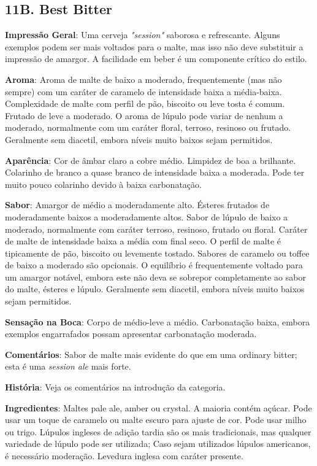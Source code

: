 \subsection*{11B. Best Bitter}
\textbf{Impressão Geral}: Uma cerveja \textit{"session"} saborosa e refrescante. Alguns exemplos podem ser mais voltados para o malte, mas isso não deve substituir a impressão de amargor. A facilidade em beber é um componente crítico do estilo.

\textbf{Aroma}: Aroma de malte de baixo a moderado, frequentemente (mas não sempre) com um caráter de caramelo de intensidade baixa a média-baixa. Complexidade de malte com perfil de pão, biscoito ou leve tosta é comum. Frutado de leve a moderado. O aroma de lúpulo pode variar de nenhum a moderado, normalmente com um caráter floral, terroso, resinoso ou frutado. Geralmente sem diacetil, embora níveis muito baixos sejam permitidos.

\textbf{Aparência}: Cor de âmbar claro a cobre médio. Limpidez de boa a brilhante. Colarinho de branco a quase branco de intensidade baixa a moderada. Pode ter muito pouco colarinho devido à baixa carbonatação.

\textbf{Sabor}: Amargor de médio a moderadamente alto. Ésteres frutados de moderadamente baixos a moderadamente altos. Sabor de lúpulo de baixo a moderado, normalmente com caráter terroso, resinoso, frutado ou floral. Caráter de malte de intensidade baixa a média com final seco. O perfil de malte é tipicamente de pão, biscoito ou levemente tostado. Sabores de caramelo ou toffee de baixo a moderado são opcionais. O equilíbrio é frequentemente voltado para um amargor notável, embora este não deva se sobrepor completamente ao sabor do malte, ésteres e lúpulo. Geralmente sem diacetil, embora níveis muito baixos sejam permitidos.

\textbf{Sensação na Boca}: Corpo de médio-leve a médio. Carbonatação baixa, embora exemplos engarrafados possam apresentar carbonatação moderada.

\textbf{Comentários}: Sabor de malte mais evidente do que em uma ordinary bitter; esta é uma \textit{session ale} mais forte.

\textbf{História}: Veja os comentários na introdução da categoria.

\textbf{Ingredientes}: Maltes pale ale, amber ou crystal. A maioria contém açúcar. Pode usar um toque de caramelo ou malte escuro para ajuste de cor. Pode usar milho ou trigo. Lúpulos ingleses de adição tardia são os mais tradicionais, mas qualquer variedade de lúpulo pode ser utilizada; Caso sejam utilizados lúpulos americanos, é necessário moderação. Levedura inglesa com caráter presente.

